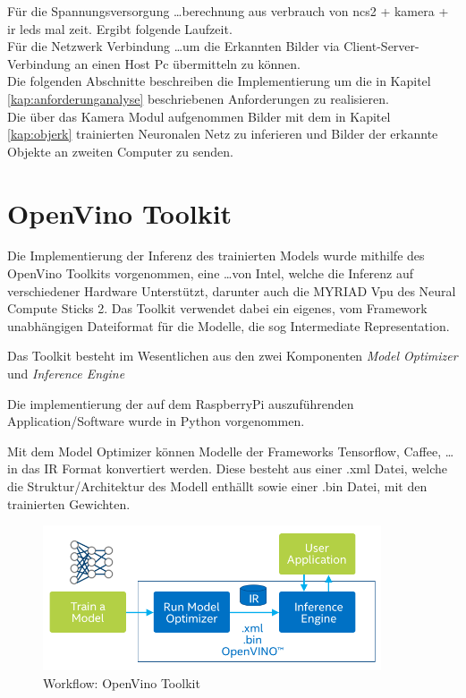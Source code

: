 Für die Spannungsversorgung \dots berechnung aus verbrauch von ncs2 + 
kamera + ir leds mal zeit. Ergibt folgende Laufzeit.\\
Für die Netzwerk Verbindung \dots um die Erkannten Bilder via 
Client-Server-Verbindung an einen Host Pc übermitteln zu können.\\

Die folgenden Abschnitte beschreiben die Implementierung um die in Kapitel 
\ref{kap:anforderunganalyse} beschriebenen Anforderungen zu realisieren.
\\
Die über das Kamera Modul aufgenommen Bilder mit dem in Kapitel 
\ref{kap:objerk} trainierten Neuronalen Netz zu inferieren und Bilder 
der erkannte Objekte an zweiten Computer zu senden.





\section{OpenVino Toolkit}\label{sec:openvino}

Die Implementierung der Inferenz des trainierten Models wurde 
mithilfe des OpenVino Toolkits vorgenommen, eine \dots von Intel, 
welche die Inferenz auf verschiedener Hardware Unterstützt, darunter 
auch die MYRIAD Vpu des Neural Compute Sticks 2. Das Toolkit 
verwendet dabei ein eigenes, vom Framework unabhängigen Dateiformat 
für die Modelle, die sog Intermediate Representation.

Das Toolkit besteht im Wesentlichen aus den zwei Komponenten 
\textit{Model Optimizer} und \textit{Inference Engine}



Die implementierung der auf dem RaspberryPi auszuführenden 
Application/Software wurde in Python vorgenommen.

Mit dem Model Optimizer können Modelle der Frameworks Tensorflow, 
Caffee, \dots in das IR Format konvertiert werden. Diese besteht 
aus einer .xml Datei, welche die Struktur/Architektur des Modell 
enthällt sowie einer .bin Datei, mit den trainierten Gewichten.

\begin{figure}[htb]
    \centering
    \includegraphics[width=10cm]{./Bilder/open_vino_workflow_steps.png}
    \caption{Workflow: OpenVino Toolkit}
    \label{img:ov_workflow}
\end{figure}

